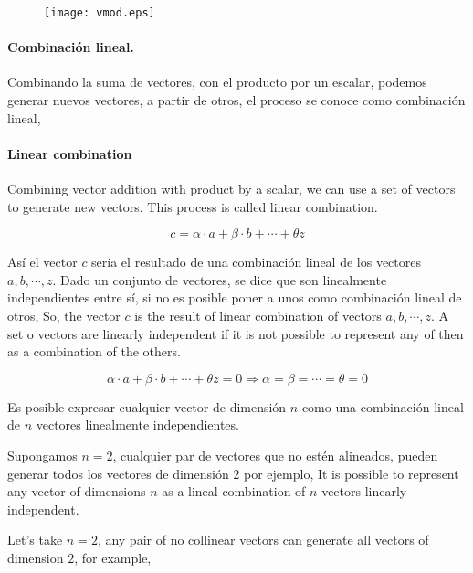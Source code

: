 \begin{figure}[h]
\centering
\texttt{[image: vmod.eps]}
\label{fig:vmod}
\end{figure}
\begin{paracol}{2}
\paragraph{Combinación lineal.} Combinando la suma de vectores, con el producto por un escalar, podemos generar nuevos vectores, a partir de otros, el proceso se conoce como combinación lineal,
\switchcolumn
\paragraph{Linear combination}Combining vector addition with product by a scalar, we can use a set of vectors to generate new vectors. This process is called linear combination. 
\end{paracol}
\begin{equation*}
c=\alpha \cdot a + \beta \cdot b + \cdots +\theta z
\end{equation*}
\begin{paracol}{2}
Así el vector $c$ sería el resultado de una combinación  lineal de los vectores $a, b, \cdots, z$. 
Dado un conjunto de vectores, se dice que son linealmente independientes entre sí, si no es posible poner a unos como combinación lineal de otros,
\switchcolumn
So, the vector $c$ is the result of linear combination of vectors $a,b,\cdots, z$.
A set o vectors are linearly independent if it is not possible to represent any of then as a combination of the others.
\end{paracol}

\begin{equation*}
\alpha \cdot a + \beta \cdot b + \cdots +\theta z=0 \Rightarrow \alpha =\beta =\cdots =\theta =0
\end{equation*}

\begin{paracol}{2}
Es posible expresar cualquier vector de dimensión $n$ como una combinación lineal de $n$ vectores linealmente independientes.

Supongamos $n=2$, cualquier par de vectores que no estén alineados, pueden generar todos los vectores de dimensión $2$ por ejemplo,
\switchcolumn
It is possible to represent any vector of dimensions $n$ as a lineal combination of $n$ vectors linearly independent.

Let's take $n=2$,  any pair of no collinear vectors can generate all vectors of dimension $2$, for example,
\end{paracol}

